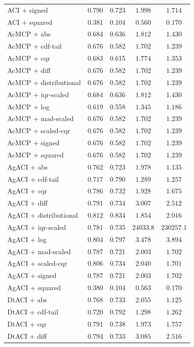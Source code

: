 \begin{longtable}{lcccc}
	ACI + signed & 0.790 & 0.723 & $1.998$ & $1.714$ \\
	ACI + squared & 0.381 & 0.104 & $0.560$ & $0.170$ \\
	AcMCP + abs & 0.684 & 0.636 & $1.812$ & $1.430$ \\
	AcMCP + cdf-tail & 0.676 & 0.582 & $1.702$ & $1.239$ \\
	AcMCP + cqr & 0.683 & 0.615 & $1.774$ & $1.353$ \\
	AcMCP + diff & 0.676 & 0.582 & $1.702$ & $1.239$ \\
	AcMCP + distributional & 0.676 & 0.582 & $1.702$ & $1.239$ \\
	AcMCP + iqr-scaled & 0.684 & 0.636 & $1.812$ & $1.430$ \\
	AcMCP + log & 0.619 & 0.558 & $1.345$ & $1.186$ \\
	AcMCP + mad-scaled & 0.676 & 0.582 & $1.702$ & $1.239$ \\
	AcMCP + scaled-cqr & 0.676 & 0.582 & $1.702$ & $1.239$ \\
	AcMCP + signed & 0.676 & 0.582 & $1.702$ & $1.239$ \\
	AcMCP + squared & 0.676 & 0.582 & $1.702$ & $1.239$ \\
	AgACI + abs & 0.762 & 0.723 & $1.978$ & $1.135$ \\
	AgACI + cdf-tail & 0.717 & 0.790 & $1.289$ & $1.257$ \\
	AgACI + cqr & 0.786 & 0.732 & $1.928$ & $1.675$ \\
	AgACI + diff & 0.791 & 0.734 & $3.007$ & $2.512$ \\
	AgACI + distributional & 0.812 & 0.834 & $1.854$ & $2.016$ \\
	AgACI + iqr-scaled & 0.781 & 0.735 & $24033.8$ & $230257.1$ \\
	AgACI + log & 0.804 & 0.797 & $3.478$ & $3.894$ \\
	AgACI + mad-scaled & 0.787 & 0.721 & $2.003$ & $1.702$ \\
	AgACI + scaled-cqr & 0.806 & 0.734 & $2.040$ & $1.701$ \\
	AgACI + signed & 0.787 & 0.721 & $2.003$ & $1.702$ \\
	AgACI + squared & 0.380 & 0.104 & $0.563$ & $0.170$ \\
	DtACI + abs & 0.768 & 0.733 & $2.055$ & $1.125$ \\
	DtACI + cdf-tail & 0.720 & 0.792 & $1.298$ & $1.262$ \\
	DtACI + cqr & 0.791 & 0.738 & $1.973$ & $1.757$ \\
	DtACI + diff & 0.794 & 0.733 & $3.085$ & $2.516$ \\

\end{longtable}
